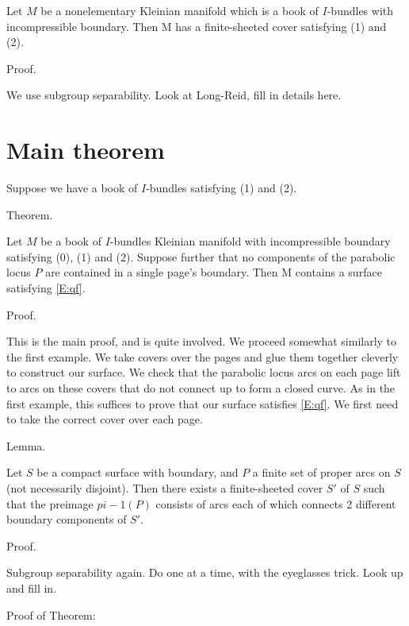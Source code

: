 \documentclass[12pt]{amsart}
\theoremstyle{definition}
\theoremstyle{remark}
\begin{document}
Let $M$ be a nonelementary Kleinian manifold which is a book of $I$-bundles with
incompressible boundary. Then M has a finite-sheeted cover satisfying (1) and
(2).

Proof.

We use subgroup separability. Look at Long-Reid, fill in details here.

\section{Main theorem}

Suppose we have a book of $I$-bundles satisfying (1) and (2).

Theorem.

Let $M$ be a book of $I$-bundles Kleinian manifold with incompressible boundary
satisfying (0), (1) and (2). Suppose further that no components of the
parabolic locus $P$ are contained in a single page's boundary. Then M contains
a surface satisfying \eqref{E:qf}.

Proof.

This is the main proof, and is quite involved. We proceed somewhat similarly to
the first example. We take covers over the pages and glue them together
cleverly to construct our surface. We check that the parabolic locus arcs on
each page lift to arcs on these covers that do not connect up to form a closed
curve. As in the first example, this suffices to prove that our surface
satisfies \eqref{E:qf}. We first need to take the correct cover over each page.

Lemma.

Let $S$ be a compact surface with boundary, and $P$ a finite set of proper arcs
on $S$ (not necessarily disjoint).  Then there exists a finite-sheeted cover
$S'$ of $S$ such that the preimage $pi-1(P)$ consists of arcs each of which
connects 2 different boundary components of $S'$.

Proof.

Subgroup separability again. Do one at a time, with the eyeglasses trick.  Look
up and fill in.

Proof of Theorem:

\end{document}

